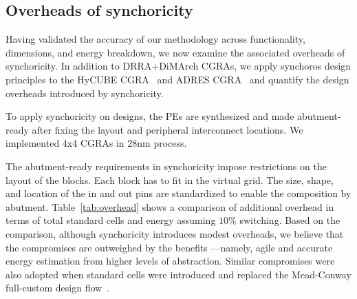 \subsection{Overheads of synchoricity}
Having validated the accuracy of our methodology across functionality, dimensions, and energy breakdown, we now examine the associated overheads of synchoricity. 
In addition to DRRA+DiMArch CGRAs, we apply synchoros design principles to the HyCUBE CGRA~\cite{karunaratne2017hycube} and ADRES CGRA~\cite{mei2007adres} and quantify the design overheads introduced by synchoricity.

To apply synchoricity on designs, the PEs are synthesized and made abutment-ready after fixing the layout and peripheral interconnect locations. 
We implemented 4x4 CGRAs in 28nm process.


The abutment-ready requirements in synchoricity impose restrictions on the layout of the blocks. 
Each block has to fit in the virtual grid. 
The size, shape, and location of the in and out pins are standardized to enable the composition by abutment. 
Table~\ref {tab:overhead} shows a comparison of additional overhead in terms of total standard cells and energy assuming $10\%$ switching. 
Based on the comparison, although synchoricity introduces modest overheads, we believe that the compromises are outweighed by the benefits —namely, agile and accurate energy estimation from higher levels of abstraction.
Similar compromises were also adopted when standard cells were introduced and replaced the Mead-Conway full-custom design flow~\cite{dally201321st}.



